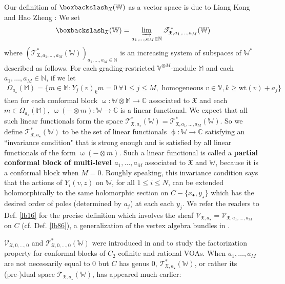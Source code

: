 \documentclass[11pt,b5paper,notitlepage]{article}
\theoremstyle{definition}
\theoremstyle{plain}
\newcommand{\fk}{\mathfrak}
\newcommand{\scr}{\mathscr}
\newcommand{\blt}{\bullet}
\newcommand{\Vbb}{\mathbb V}
\newcommand{\Wbb}{\mathbb W}
\newcommand{\Mbb}{\mathbb M}
\newcommand{\Cbb}{\mathbb C}
\newcommand{\Nbb}{\mathbb N}
\newcommand{\wt}{\mathrm{wt}}
\newcommand{\<}{\left\langle}
\renewcommand{\>}{\right\rangle}
\newcommand{\fx}{\mathfrak{X}}
\newcommand{\bbs}{\boxbackslash}
\numberwithin{equation}{section}
\begin{document}
Our definition of $\bbs_\fx(\Wbb)$ as a vector space is due to Liang Kong and Hao Zheng \cite{KZ-conformal-block}: We set
\begin{align*}
\bbs_\fx(\Wbb)=\varinjlim_{a_1,\dots,a_M\in\Nbb}\scr T_{\fx,a_1,\dots,a_M}^*(\Wbb)
\end{align*}
where $(\scr T_{\fx,a_1,\dots,a_M}^*(\Wbb))_{a_1,\dots,a_M\in\Nbb}$ is an increasing system of subspaces of $\Wbb^*$ described as follows. For each grading-restricted $\Vbb^{\otimes M}$-module $\Mbb$ and each $a_1,\dots,a_M\in\Nbb$, if we let
\begin{align*}
\Omega_{a_\star}(\Mbb)=\{m\in \Mbb:Y_j(v)_km=0~\forall 1\leq j\leq M,\text{ homogeneous }v\in\Vbb,k\geq\wt(v)+a_j\}
\end{align*}
then for each conformal block $\upomega:\Wbb\otimes\Mbb\rightarrow\Cbb$ associated to $\fx$ and each $m\in\Omega_{a_\star}(\Mbb)$, $\upomega(-\otimes m):\Wbb\rightarrow\Cbb$ is a linear functional. We expect that all such linear functionals form the space $\scr T_{\fx,a_\star}^*(\Wbb)=\scr T_{\fx,a_1,\dots,a_M}^*(\Wbb)$. So we define $\scr T_{\fx,a_\star}^*(\Wbb)$ to be the set of linear functionals $\upphi:\Wbb\rightarrow\Cbb$ satisfying an ``invariance condition" that is strong enough and is satisfied by all linear functionals of the form $\upomega(-\otimes m)$. Such a linear functional is called a \textbf{partial conformal block of multi-level $a_1,\dots,a_M$} associated to $\fk X$ and $\Wbb$, because it is a conformal block when $M=0$. Roughly speaking, this invariance condition says that the actions of $Y_i(v,z)$ on $\Wbb$, for all $1\leq i\leq N$, can be extended holomorphically to the same holomorphic section on $C-\{x_\blt,y_\star\}$ which has the desired order of poles (determined by $a_j$) at each each $y_j$. We refer the readers to Def. \ref{lb16} for the precise definition which involves the sheaf $\scr V_{\fx,a_\star}=\scr V_{\fx,a_1,\dots,a_M}$ on $C$ (cf. Def. \ref{lb86}), a generalization of the vertex algebra bundles in \cite[Ch. 6]{FB04}. 

$\scr V_{\fx,0,\dots,0}$ and $\scr T_{\fx,0,\dots,0}^*(\Wbb)$ were introduced in \cite[Sec. 7.2]{NT-P1_conformal_blocks} and \cite[Sec. 6.2]{DGT2} to study the factorization property for conformal blocks of $C_2$-cofinite and rational VOAs. When $a_1,\dots,a_M$ are not necessarily equal to $0$ but $C$ has genus $0$, $\scr T_{\fx,a_\star}^*(\Wbb)$, or rather its (pre-)dual space $\scr T_{\fx,a_\star}(\Wbb)$, has appeared much earlier:
\end{document}
